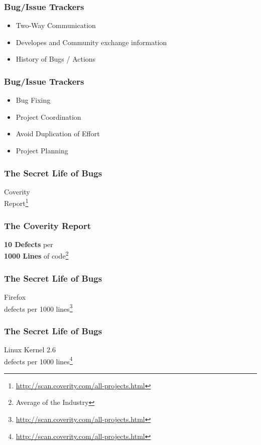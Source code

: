 \documentclass[18pt]{beamer}
\begin{document}
\begin{frame}
\frametitle{Bug/Issue Trackers}
\Huge
\begin{itemize}
\item Two-Way Communication
\pause
\item Developes and Community exchange information
\pause
\item History of Bugs / Actions
\end{itemize}
\end{frame}


\begin{frame}
\frametitle{Bug/Issue Trackers}
\Huge
\begin{itemize}
\item Bug Fixing
\pause
\item Project Coordination
\pause
\item Avoid Duplication of Effort
\pause
\item Project Planning
\end{itemize}
\end{frame}


\begin{frame}
\frametitle{The Secret Life of Bugs}
\Huge
\begin{center}
Coverity\\
\bigskip
Report\footnote{\url{http://scan.coverity.com/all-projects.html}}
\end{center}
\end{frame}


\begin{frame}
\frametitle{The Coverity Report}
\Huge
\begin{center}
\textbf{10 Defects} per\\
\bigskip
\textbf{1000 Lines} of code\footnote{Average of the Industry}
\end{center}
\end{frame}

\begin{frame}
\frametitle{The Secret Life of Bugs}
\Huge
\begin{center}
Firefox\\
 defects per 1000 lines\footnote{\url{http://scan.coverity.com/all-projects.html}}
\end{center}
\end{frame}


\begin{frame}
\frametitle{The Secret Life of Bugs}
\Huge
\begin{center}
Linux Kernel 2.6\\
 defects per 1000 lines\footnote{\url{http://scan.coverity.com/all-projects.html}}

\end{center}
\end{frame}
\end{document}
